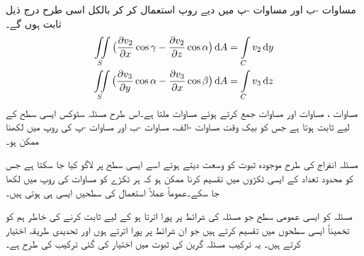 مساوات -ب اور مساوات -پ میں دیے روپ استعمال کر کر بالکل اسی طرح درج ذیل ثابت ہوں گے۔
\begin{align}
\iint\limits_S \big(\frac{\partial v_2}{\partial x}\cos \gamma-\frac{\partial v_2}{\partial z}\cos \alpha\big)\dif A
&=\int\limits_C v_2\dif y \label{مساوات_خطی_تکمل_سٹوکس_ج}\\
\iint\limits_S \big(\frac{\partial v_3}{\partial y}\cos \alpha-\frac{\partial v_3}{\partial x}\cos \beta\big)\dif A
&=\int\limits_C v_3\dif z\label{مساوات_خطی_تکمل_سٹوکس_چ}
\end{align}
مساوات ، مساوات  اور مساوات  جمع کرتے ہوئے مساوات  ملتا ہے۔اس طرح مسئلہ سٹوکس ایسی سطح   کے لیے ثابت ہوتا ہے جس کو بیک وقت   مساوات -الف،  مساوات -ب اور  مساوات -پ کی روپ  میں لکھنا ممکن ہو۔

مسئلہ انفراج کی طرح موجودہ ثبوت کو وسعت دیتے ہوئے اسے ایسی سطح پر لاگو کیا جا سکتا ہے جس کو محدود تعداد کے ایسی ٹکڑوں میں تقسیم کرنا ممکن ہو کہ ہر ٹکڑے کو مساوات  کی روپ میں لکھا جا سکے۔عموماً عملاً استعمال کی سطحیں ایسی ہی ہوتی ہیں۔

مسئلہ کو ایسی عمومی سطح  جو مسئلہ کی شرائط پر پورا اترتا ہو کے  لیے ثابت کرنے کی خاطر ہم   کو تخمیناً ایسی سطحوں میں تقسیم کرتے ہیں جو ان شرائط پر پورا اترتے ہوں اور تحدیدی طریقہ اختیار کرتے ہیں۔ یہ ترکیب مسئلہ گرین کی ثبوت میں اختیار کی گئی ترکیب کی طرح ہے۔

